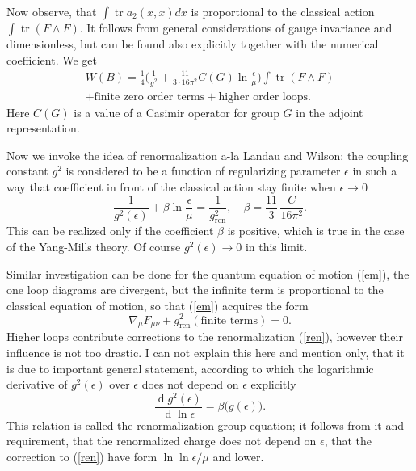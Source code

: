 \documentclass[12pt]{article}
\DeclareMathOperator{\tr}{tr}
\DeclareMathOperator{\dd}{d}
\begin{document}
	Now observe, that
    $ \int \tr a_{2}(x,x) dx $
	is proportional to the classical action
    $ \int \tr (F \wedge F) $.
	It follows from general considerations of gauge invariance
	and dimensionless, but can be found also explicitly together 
	with the numerical coefficient.
	We get
\begin{equation}
\begin{split}
    W(B) = \frac{1}{4}\bigl(\frac{1}{g^{2}} + 
	    \frac{11}{3 \cdot 16 \pi^{2}} C(G) \ln \frac{\epsilon}{\mu} \bigr) 
		\int \tr (F\wedge F) \\
    + \text{finite zero order terms} + \text{higher order loops} .
\end{split}
\end{equation}
	Here
    $ C(G) $
	is a value of a Casimir operator for group
    $ G $
	in the adjoint representation.

	Now we invoke the idea of renormalization 
	a-la Landau and Wilson:
	the coupling constant
    $ g^{2} $
	is considered to be a function of regularizing parameter
    $ \epsilon $
	in such a way that coefficient in front of the classical 
	action stay finite when
    $ \epsilon \to 0 $
\begin{equation}
\label{ren}
    \frac{1}{g^{2}(\epsilon)} + \beta \ln \frac{\epsilon}{\mu}
	= \frac{1}{g_{\text{ren}}^{2}} , \quad
	\beta = \frac{11}{3} \, \frac{C}{16 \pi^{2}} .
\end{equation}
	This can be realized only if the coefficient
    $ \beta $
	is positive, which is true in the case of the Yang-Mills theory.
	Of course
    $ g^{2}(\epsilon) \to 0 $
	in this limit.

	Similar investigation can be done for the quantum equation of motion
(\ref{em}),
	the one loop diagrams are divergent, but the infinite term
	is proportional to the classical equation of motion,
	so that
(\ref{em})
	acquires the form
\begin{equation*}
    \nabla_{\mu} F_{\mu \nu} + g_{\text{ren}}^{2} (\text{finite terms}) = 0 .
\end{equation*}
	Higher loops contribute corrections to the renormalization
(\ref{ren}),
	however their influence is not too drastic.
	I can not explain this here and mention only, that it is due to
	important general statement, according to which the 
	logarithmic derivative of
    $ g^{2}(\epsilon) $
	over
    $ \epsilon $
	does not depend on
    $ \epsilon $
	explicitly
\begin{equation*}
    \frac{\dd g^{2}(\epsilon)}{\dd \ln \epsilon} 
	= \beta \bigl(g(\epsilon) \bigr).
\end{equation*}
	This relation is called the renormalization group
	equation; it follows from it and requirement, that
	the renormalized charge does not depend on
    $ \epsilon $,
	that the correction to
(\ref{ren})
	have form
    $ \ln \ln \epsilon / \mu $
	and lower.
\end{document}
